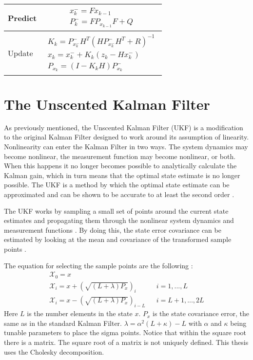 \begin{center}
\begin{tabular}{ | m{5em} | m{1cm}| } 
	\hline
	Predict & 
	\begin{align*} 
	x^-_{k} = Fx_{k-1} \\ 
	P^-_{k} = FP_{x_{k-1}}F + Q 
	\end{align*}\\ 
	\hline
	Update & 
	\begin{align*} 
	K_{k} = P^-_{x^-_k}H^T(HP^-_{x^-_k}H^T + R)^{-1} \\
	x_{k} = x^-_{k} + K_k(z_k - Hx^-_k) \\ 
	P_{x_k} = (I - K_kH)P^-_{x_k} 
	\end{align*}\\ 
	\hline
\end{tabular}
\end{center}


\section{The Unscented Kalman Filter}

As previously mentioned, the Unscented Kalman Filter (UKF) is a modification to the original Kalman Filter designed to work around its assumption of linearity. Nonlinearity can enter the Kalman Filter in two ways. The system dynamics may become nonlinear, the measurement function may become nonlinear, or both. When this happens it no longer becomes possible to analytically calculate the Kalman gain, which in turn means that the optimal state estimate is no longer possible. The UKF is a method by which the optimal state estimate can be approximated and can be shown to be accurate to at least the second order \cite{ukf_merwe}.

The UKF works by sampling a small set of points around the current state estimates and propagating them through the nonlinear system dynamics and measurement functions \cite{ukf_merwe}. By doing this, the state error covariance can be estimated by looking at the mean and covariance of the transformed sample points \cite{ukf_merwe}.



The equation for selecting the sample points are the following \cite{ukf_merwe}:
\begin{align}
\mathcal{X}_0 = x \\
\mathcal{X}_i = x + (\sqrt{(L + \lambda)P_x})_i && i = 1,...,L \\
\mathcal{X}_i = x - (\sqrt{(L + \lambda)P_x})_{i-L} && i = L+1,...,2L
\end{align}
Here $L$ is the number elements in the state $x$. $P_x$ is the state covariance error, the same as in the standard Kalman Filter. $\lambda = \alpha^2(L + \kappa) - L$ with $\alpha$ and $\kappa$ being tunable parameters to place the sigma points. Notice that within the square root there is a matrix. The square root of a matrix is not uniquely defined. This thesis uses the Cholesky decomposition.

